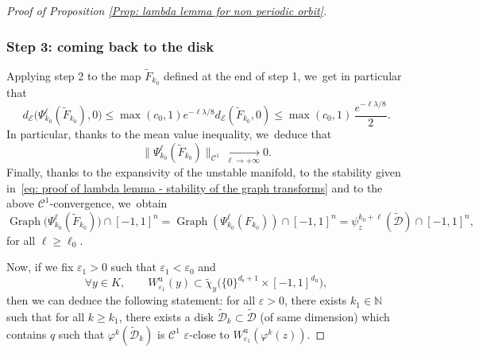 \documentclass[JEP,XML,SOM,Unicode,NoEqCountersInSection,NoFloatCountersInSection,published]{cedram}
\newcommand{\rs}{\mathrm{s}}
\newcommand{\ru}{\mathrm{u}}
\theoremstyle{definition}
\theoremstyle{plain}
\newcommand{\Ccal}{\mathcal{C}}
\newcommand{\D}{\mathcal{D}}
\newcommand{\Ecal}{\mathcal{E}}
\newcommand{\N}{\mathbb{N}}
\DeclareMathOperator{\Graph}{Graph}
\begin{document}
\begin{appendix}
\begin{proof}[Proof of Proposition \ref{Prop: lambda lemma for non periodic orbit}]
\subsubsection*{Step 3: coming back to the disk}
Applying step 2 to the map $\widetilde{F}_{k_0}$ defined at the end of step 1, we~get in particular that
\[
d_{\Ecal} \bigl(\Psi_{k_0}^{\ell} (\widetilde{F}_{k_0}), 0 \bigr) \leq \max (c_0, 1) e^{- \ell \lambda/8} d_{\Ecal}(\widetilde{F}_{k_0}, 0) \leq \max (c_0, 1)\, \frac{e^{- \ell \lambda/8}}{2}.
\]
In particular, thanks to the mean value inequality, we~deduce that
\[
\bigl\| \Psi_{k_0}^{\ell} (\widetilde{F}_{k_0}) \bigr\|_{\Ccal^1} \underset{\ell \to +\infty}{\to} 0.
\]
Finally, thanks to the expansivity of the unstable manifold, to the stability given in~\eqref{eq: proof of lambda lemma - stability of the graph transforms} and to the above $\Ccal^1$-convergence, we~obtain
\[
\Graph \bigl(\Psi_{k_0}^{\ell} (\widetilde{F}_{k_0}) \bigr) \cap [-1,1]^n = \Graph \left(\Psi_{k_0}^{\ell} (F_{k_0}) \right) \cap [-1,1]^n = \psi_z^{k_0 + \ell}(\widetilde{\D}) \cap [-1,1]^n,
\]
for all $\ell \geq \ell_0$.

Now, if we fix $\varepsilon_1 > 0$ such that $\varepsilon_1 < \varepsilon_0$ and
\[
\forall y \in K, \qquad W_{\varepsilon_1}^\ru (y) \subset \widetilde{\chi}_{y} \bigl(\{0\}^{d_\rs + 1} \times [-1,1]^{d_\ru} \bigr),
\]
then we can deduce the following statement: for all $\varepsilon > 0$, there exists $k_1 \in \N$ such that for all $k \geq k_1$, there exists a disk $\widetilde{\D}_k \subset \widetilde{\D}$ (of same dimension) which contains $q$ such that $\varphi^k(\widetilde{\D}_k)$ is $\Ccal^{1}$ $\varepsilon$-close to $W_{\varepsilon_1}^\ru (\varphi^k (z))$.
\end{proof}

\end{appendix}

\backmatter


\end{document}
